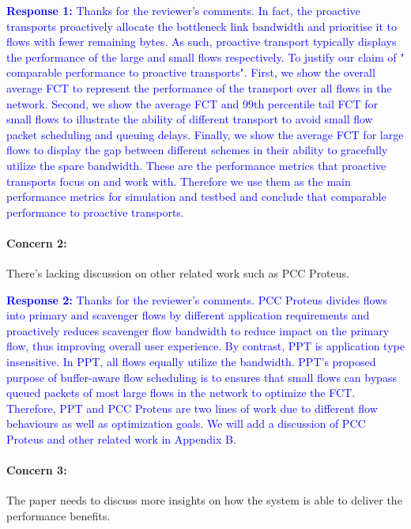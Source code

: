 \documentclass[12pt,one-column]{article}
\begin{document}
\noindent\textcolor{blue}{\textbf{Response 1:} 
Thanks for the reviewer’s comments. 
In fact, the proactive transports proactively allocate the bottleneck link bandwidth and prioritise it to flows with fewer remaining bytes.
As such, proactive transport typically displays the performance of the large and small flows respectively. 
To justify our claim of " comparable performance to proactive transports".
First, we show the overall average FCT to represent the performance of the transport over all flows in the network.
Second, we show the average FCT and 99th percentile tail FCT for small flows to illustrate the ability of different transport to avoid small flow packet scheduling and queuing delays.
Finally, we show the average FCT for large flows to display the gap between different schemes in their ability to gracefully utilize the spare bandwidth.
These are the performance metrics that proactive transports focus on and work with.
Therefore we use them as the main performance metrics for simulation and testbed and conclude that comparable performance to proactive transports.
  }

{\it \paragraph{Concern 2:} There's lacking discussion on other related work such as PCC Proteus.}



\noindent\textcolor{blue}{\textbf{Response 2:} 
Thanks for the reviewer’s comments. 
PCC Proteus divides flows into primary and scavenger flows by different application requirements and proactively reduces scavenger flow bandwidth to reduce impact on the primary flow, thus improving overall user experience.
By contrast, PPT is application type insensitive.
In PPT, all flows equally utilize the bandwidth.
PPT's proposed purpose of buffer-aware flow scheduling is to ensures that small flows can bypass queued packets of most large flows in the network to optimize the FCT.
Therefore, PPT and PCC Proteus are two lines of work due to different flow behaviours as well as optimization goals.
We will add a discussion of PCC Proteus and other related work in Appendix B.
}

{\it \paragraph{Concern 3:} The paper needs to discuss more insights on how the system is able to deliver the performance benefits.}
\end{document}
